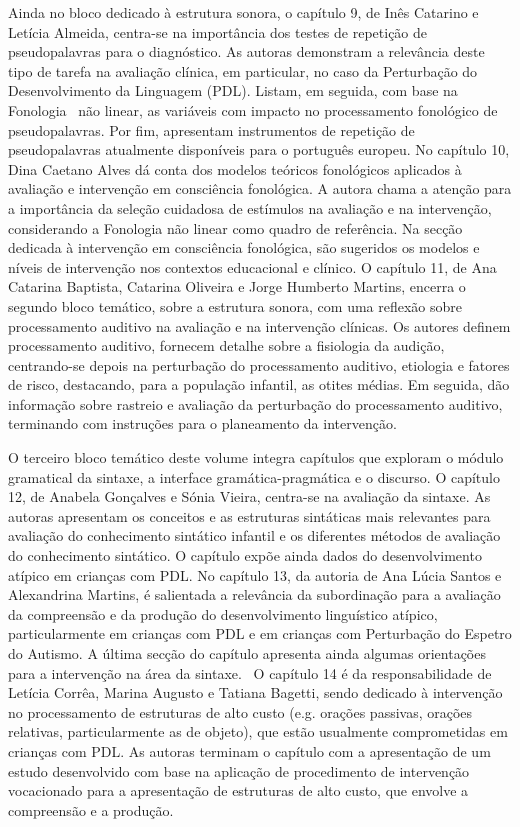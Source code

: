 \begin{refsection}
Ainda no bloco dedicado à estrutura sonora, o capítulo 9, de Inês Catarino e Letícia Almeida, centra-se na importância dos testes de repetição de pseudopala\-vras para o diagnóstico. As autoras demonstram a relevância deste tipo de tarefa na avaliação clínica, em particular, no caso da Perturbação do Desenvolvimento da Linguagem (PDL). Listam, em seguida, com base na Fonologia  não linear, as variáveis com impacto no processamento fonológico de pseudopalavras. Por fim, apresentam instrumentos de repetição de pseudopalavras atualmente disponíveis para o português europeu. No capítulo 10, Dina Caetano Alves dá conta dos modelos teóricos fonológicos aplicados à avaliação e intervenção em consciência fonológica. A autora chama a atenção para a importância da seleção cuidadosa de estímulos na avaliação e na intervenção, considerando a Fonologia não linear como quadro de referência. Na secção dedicada à intervenção em consciência fonológica, são sugeridos os modelos e níveis de intervenção nos contextos educacional e clínico. O capítulo 11, de Ana Catarina Baptista, Catarina Oliveira e Jorge Humberto Martins, encerra o segundo bloco temático, sobre a estrutura sonora, com uma reflexão sobre processamento auditivo na avaliação e na intervenção clínicas. Os autores definem processamento auditivo, fornecem detalhe sobre a fisiologia da audição, centrando-se depois na perturbação do processamento auditivo, etiologia e fatores de risco, destacando, para a população infantil, as otites médias. Em seguida, dão informação sobre rastreio e avaliação da perturbação do processamento auditivo, terminando com instruções para o planeamento da intervenção.

O terceiro bloco temático deste volume integra capítulos que exploram o módulo gramatical da sintaxe, a interface gramática-pragmática e o discurso. O capítulo 12, de Anabela Gonçalves e Sónia Vieira, centra-se na avaliação da sintaxe. As autoras apresentam os conceitos e as estruturas sintáticas mais relevantes para avaliação do conhecimento sintático infantil e os diferentes métodos de avaliação do conhecimento sintático. O capítulo expõe ainda dados do desenvolvimento atípico em crianças com PDL. No capítulo 13, da autoria de Ana Lúcia Santos e Alexandrina Martins, é salientada a relevância da subordinação para a avaliação da compreensão e da produção do desenvolvimento linguístico atípico, particularmente em crianças com PDL e em crianças com Perturbação do Espetro do Autismo. A última secção do capítulo apresenta ainda algumas orientações para a intervenção na área da sintaxe.  O capítulo 14 é da responsabilidade de Letícia Corrêa, Marina Augusto e Tatiana Bagetti, sendo dedicado à intervenção no processamento de estruturas de alto custo (e.g. orações passivas, orações relativas, particularmente as de objeto), que estão usualmente comprometidas em crianças com PDL. As autoras terminam o capítulo com a apresentação de um estudo desenvolvido com base na aplicação de procedimento de intervenção vocacionado para a apresentação de estruturas de alto custo, que envolve a compreensão e a produção. 


\end{refsection}
